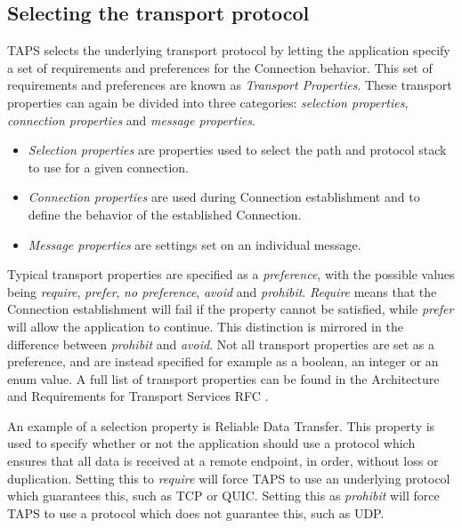 \subsection{Selecting the transport protocol}
TAPS selects the underlying transport protocol by
letting the application specify a set of requirements
and preferences for the Connection behavior. This set of requirements
and preferences are known as \textit{Transport Properties}. These transport
properties can again be divided into three categories: \textit{selection
properties}, \textit{connection properties} and \textit{message properties}. 

\begin{itemize}
    \item \textit{Selection
properties} are properties used to select the path and protocol stack
to use for a given connection. 

    \item \textit{Connection properties} are used
during Connection establishment and to define the behavior of the
established Connection. 

    \item \textit{Message properties} are settings set on an
individual message. 
\end{itemize}

Typical transport properties are specified as
a \textit{preference}, with the possible values being \textit{require},
\textit{prefer}, \textit{no preference}, \textit{avoid} and \textit{prohibit}.
\textit{Require} means that the Connection establishment will fail if the property cannot
be satisfied, while \textit{prefer} will allow the application to continue.
This distinction is mirrored in the difference between \textit{prohibit} and \textit{avoid}.
Not all transport properties are set as a preference, and are
instead specified for example as a boolean, an integer or an enum value.
A full list of transport properties can be found in the Architecture and Requirements for
Transport Services RFC
\cite{paulyArchitectureRequirementsTransport2025}.

An example of a selection property is Reliable Data Transfer.
This property is used to specify whether or not the application
should use a protocol which ensures that all data is received at 
a remote endpoint, in order, without loss or duplication. Setting
this to \textit{require} will force TAPS to use an underlying protocol
which guarantees this, such as TCP or QUIC. Setting this as
\textit{prohibit} will force TAPS to use a protocol which does not
guarantee this, such as UDP.


